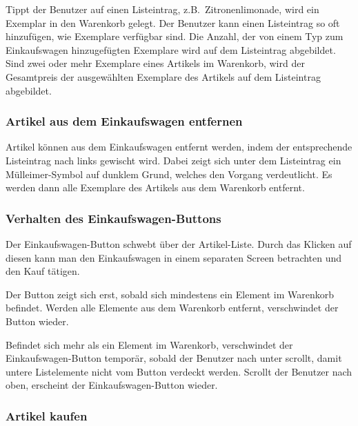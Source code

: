 Tippt der Benutzer auf einen Listeintrag, z.B.\ Zitronenlimonade, wird ein Exemplar in den Warenkorb gelegt.
Der Benutzer kann einen Listeintrag so oft hinzufügen, wie Exemplare verfügbar sind.
Die Anzahl, der von einem Typ zum Einkaufswagen hinzugefügten Exemplare wird auf dem Listeintrag abgebildet.
Sind zwei oder mehr Exemplare eines Artikels im Warenkorb, wird der Gesamtpreis der ausgewählten Exemplare des Artikels auf dem Listeintrag abgebildet.

\subsubsection{Artikel aus dem Einkaufswagen entfernen} \label{subsubsec:shoppingcart-del-item}

Artikel können aus dem Einkaufswagen entfernt werden, indem der entsprechende Listeintrag nach links gewischt wird.
Dabei zeigt sich unter dem Listeintrag ein Mülleimer-Symbol auf dunklem Grund, welches den Vorgang verdeutlicht.
Es werden dann alle Exemplare des Artikels aus dem Warenkorb entfernt.

\subsubsection{Verhalten des Einkaufswagen-Buttons} \label{subsubsec:shoppingcart-button}

Der Einkaufswagen-Button schwebt über der Artikel-Liste.
Durch das Klicken auf diesen kann man den Einkaufswagen in einem separaten Screen betrachten und den Kauf tätigen.

Der Button zeigt sich erst, sobald sich mindestens ein Element im Warenkorb befindet.
Werden alle Elemente aus dem Warenkorb entfernt, verschwindet der Button wieder.

Befindet sich mehr als ein Element im Warenkorb, verschwindet der Einkaufswagen-Button temporär, sobald der Benutzer nach unter scrollt, damit untere Listelemente nicht vom Button verdeckt werden.
Scrollt der Benutzer nach oben, erscheint der Einkaufswagen-Button wieder.

\subsubsection{Artikel kaufen} \label{subsubsec:shop-buy}


